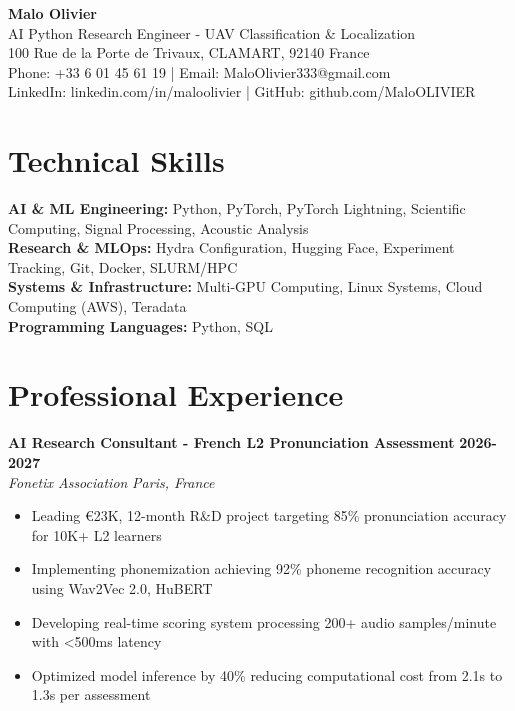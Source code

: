 \documentclass[10pt,letterpaper]{article}
\newcommand{\resumeItem}[1]{\item\footnotesize{#1}}
\newenvironment{resumeExperience}[4]{
    \vspace{1pt}
    \textbf{\small #1} \hfill \textbf{\small #2} \\
    \textit{\small #3} \hfill \textit{\small #4}
    \vspace{0pt}
    \begin{itemize}[leftmargin=*,noitemsep,topsep=0pt,itemsep=0pt]
}{
    \end{itemize}
    \vspace{2pt}
}
\begin{document}
\begin{center}
    {\Large \textbf{Malo Olivier}} \\
    \vspace{2pt}
    {\normalsize AI Python Research Engineer - UAV Classification \& Localization} \\
    \vspace{3pt}
    {\small 100 Rue de la Porte de Trivaux, CLAMART, 92140 France} \\
    {\small Phone: +33 6 01 45 61 19 | Email: MaloOlivier333@gmail.com} \\
    {\small LinkedIn: linkedin.com/in/maloolivier | GitHub: github.com/MaloOLIVIER}
\end{center}

\vspace{4pt}

\section{Technical Skills}
{\small \textbf{AI \& ML Engineering:} Python, PyTorch, PyTorch Lightning, Scientific Computing, Signal Processing, Acoustic Analysis} \\
{\small \textbf{Research \& MLOps:} Hydra Configuration, Hugging Face, Experiment Tracking, Git, Docker, SLURM/HPC} \\
{\small \textbf{Systems \& Infrastructure:} Multi-GPU Computing, Linux Systems, Cloud Computing (AWS), Teradata} \\
{\small \textbf{Programming Languages:} Python, SQL}

\section{Professional Experience}

\begin{resumeExperience}{AI Research Consultant - French L2 Pronunciation Assessment}{2026-2027}{Fonetix Association}{Paris, France}
    \resumeItem{Leading €23K, 12-month R\&D project targeting 85\% pronunciation accuracy for 10K+ L2 learners}
    \resumeItem{Implementing phonemization achieving 92\% phoneme recognition accuracy using Wav2Vec 2.0, HuBERT}
    \resumeItem{Developing real-time scoring system processing 200+ audio samples/minute with <500ms latency}
    \resumeItem{Optimized model inference by 40\% reducing computational cost from 2.1s to 1.3s per assessment}
\end{resumeExperience}
\end{document}
